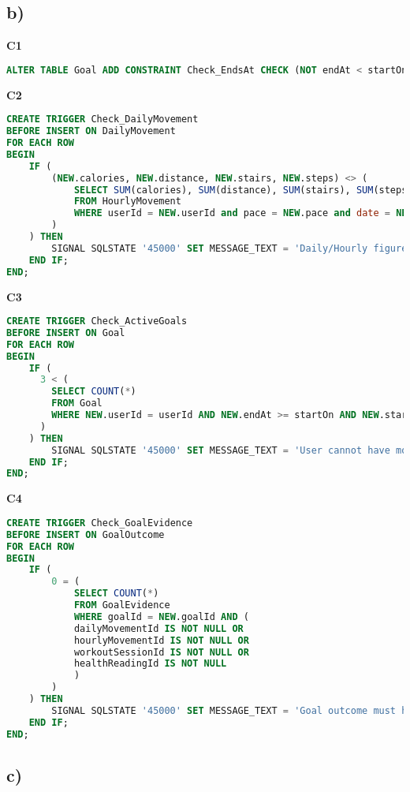 \documentclass{article}
\begin{document}
\pagebreak
\subsection*{\small b)}

\textbf{\small{C1}}
\begin{lstlisting}[language=sql]
ALTER TABLE Goal ADD CONSTRAINT Check_EndsAt CHECK (NOT endAt < startOn);
\end{lstlisting}
\textbf{\small{C2}}
\begin{lstlisting}[language=sql]
CREATE TRIGGER Check_DailyMovement
BEFORE INSERT ON DailyMovement
FOR EACH ROW
BEGIN
    IF (
        (NEW.calories, NEW.distance, NEW.stairs, NEW.steps) <> (
            SELECT SUM(calories), SUM(distance), SUM(stairs), SUM(steps) 
            FROM HourlyMovement
            WHERE userId = NEW.userId and pace = NEW.pace and date = NEW.date
        )
    ) THEN
        SIGNAL SQLSTATE '45000' SET MESSAGE_TEXT = 'Daily/Hourly figures are not consistent';
    END IF;
END;
\end{lstlisting}
\textbf{\small{C3}}
\begin{lstlisting}[language=sql]
CREATE TRIGGER Check_ActiveGoals
BEFORE INSERT ON Goal
FOR EACH ROW
BEGIN
    IF (
      3 < (
        SELECT COUNT(*) 
        FROM Goal 
        WHERE NEW.userId = userId AND NEW.endAt >= startOn AND NEW.startOn <= endAt
      ) 
    ) THEN
        SIGNAL SQLSTATE '45000' SET MESSAGE_TEXT = 'User cannot have more than 3 active goals';
    END IF;
END;
\end{lstlisting}
\textbf{\small{C4}}
\begin{lstlisting}[language=sql]
CREATE TRIGGER Check_GoalEvidence
BEFORE INSERT ON GoalOutcome
FOR EACH ROW
BEGIN
    IF (  
        0 = (
            SELECT COUNT(*) 
            FROM GoalEvidence 
            WHERE goalId = NEW.goalId AND (
            dailyMovementId IS NOT NULL OR 
            hourlyMovementId IS NOT NULL OR 
            workoutSessionId IS NOT NULL OR 
            healthReadingId IS NOT NULL
            )
        )
    ) THEN
        SIGNAL SQLSTATE '45000' SET MESSAGE_TEXT = 'Goal outcome must have evidence';
    END IF;
END;
\end{lstlisting}

\pagebreak 

\subsection*{\small c)}
\end{document}
